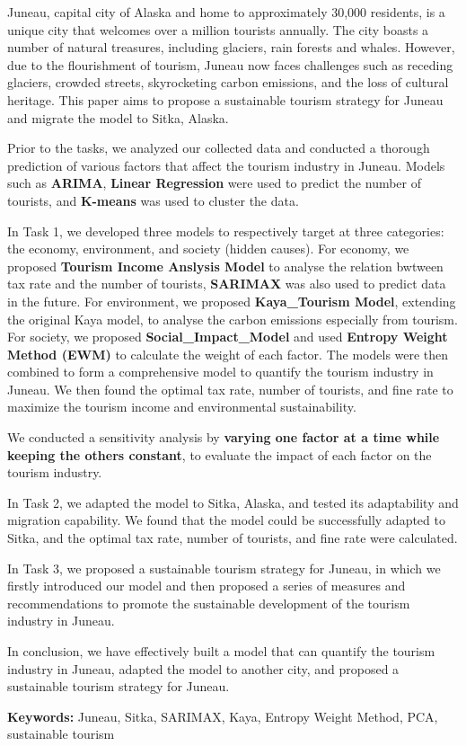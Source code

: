 \begin{summary}
    Juneau, capital city of Alaska and home to approximately 30,000 residents, 
    is a unique city that welcomes over a million tourists annually. 
    The city boasts a number of natural treasures, including glaciers, 
    rain forests and whales. However, due to the flourishment of tourism, 
    Juneau now faces challenges such as receding glaciers, crowded streets,
    skyrocketing carbon emissions, and the loss of cultural heritage.
    This paper aims to propose a sustainable tourism strategy for Juneau and
    migrate the model to Sitka, Alaska. 

    Prior to the tasks, we analyzed our collected data and conducted a thorough 
    prediction of various factors that affect the tourism industry in Juneau.
    Models such as \textbf{ARIMA}, \textbf{Linear Regression} were used to predict
    the number of tourists, and \textbf{K-means} was used to cluster the data.

    In Task 1, we developed three models to respectively target at three categories: 
    the economy, environment, and society (hidden causes). For economy, we proposed 
    \textbf{Tourism Income Anslysis Model} to analyse the relation bwtween tax rate and 
    the number of tourists, \textbf{SARIMAX} was also used to predict data in the future. 
    For environment, we proposed \textbf{Kaya\_Tourism Model}, extending the original Kaya model,
    to analyse the carbon emissions especially from tourism. 
    For society, we proposed \textbf{Social\_Impact\_Model} and used \textbf{Entropy Weight Method (EWM)}
    to calculate the weight of each factor. 
    The models were then combined to form a comprehensive model to quantify the tourism industry in Juneau.
    We then found the optimal tax rate, number of tourists, and fine rate
    to maximize the tourism income and environmental sustainability. 

    We conducted a sensitivity analysis by \textbf{varying one factor at a time while keeping the others constant}, to evaluate the impact of each factor on the tourism industry.

    In Task 2, we adapted the model to Sitka, Alaska, and tested its adaptability and migration capability.
    We found that the model could be successfully adapted to Sitka, and the optimal tax rate, number of tourists, and fine rate were calculated.

    In Task 3, we proposed a sustainable tourism strategy for Juneau, in which we firstly introduced our
    model and then proposed a series of measures and recommendations to promote the 
    sustainable development of the tourism industry in Juneau.

    In conclusion, we have effectively built a model that can quantify the tourism industry in Juneau, adapted the model to another city, and proposed a sustainable tourism strategy for Juneau.

    \vspace{0.5cm}

    \textbf{Keywords:} Juneau, Sitka, SARIMAX, Kaya, Entropy Weight Method, PCA, sustainable tourism
\end{summary}
    